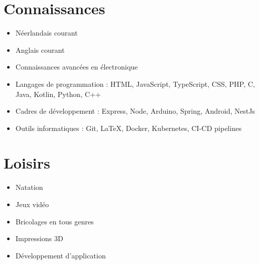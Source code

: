 \documentclass[a4paper,12pt]{article}
\begin{document}
    \section*{Connaissances}
    \begin{itemize}[noitemsep]
        \item Néerlandais courant
        \item Anglais courant
        \item Connaissances avancées en électronique
        \item Langages de programmation : HTML, JavaScript, TypeScript, CSS, PHP, C, Java, Kotlin, Python, C++
        \item Cadres de développement : Express, Node, Arduino, Spring, Android, NestJs
        \item Outils informatiques : Git, LaTeX, Docker, Kubernetes, CI-CD pipelines
    \end{itemize}

    \section*{Loisirs}
    \begin{itemize}[noitemsep]
        \item Natation
        \item Jeux vidéo
        \item Bricolages en tous genres
        \item Impressions 3D
        \item Développement d'application
    \end{itemize}
\end{document}
